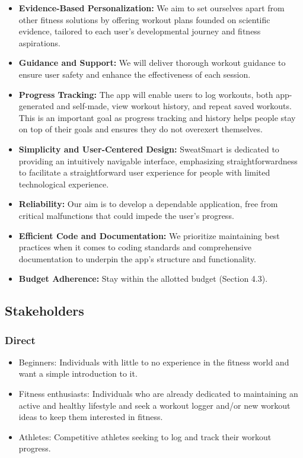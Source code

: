 \documentclass[12pt]{article}
\begin{document}
\begin{itemize}
    \item \textbf{Evidence-Based Personalization:} We aim to set ourselves apart from other fitness solutions by offering workout plans founded on scientific evidence, tailored to each user's developmental journey and fitness aspirations.
    \item \textbf{Guidance and Support:} We will deliver thorough workout guidance to ensure user safety and enhance the effectiveness of each session.
    \item \textbf{Progress Tracking:} The app will enable users to log workouts, both app-generated and self-made, view workout history, and repeat saved workouts. This is an important goal as progress tracking and history helps people stay on top of their goals and ensures they do not overexert themselves.
    \item \textbf{Simplicity and User-Centered Design:} SweatSmart is dedicated to providing an intuitively navigable interface, emphasizing straightforwardness to facilitate a straightforward user experience for people with limited technological experience.
    \item \textbf{Reliability:} Our aim is to develop a dependable application, free from critical malfunctions that could impede the user's progress.
    \item \textbf{Efficient Code and Documentation:} We prioritize maintaining best practices when it comes to coding standards and comprehensive documentation to underpin the app's structure and functionality.
    \item \textbf{Budget Adherence:} Stay within the allotted budget (Section 4.3).
\end{itemize}

\subsection{Stakeholders}

\subsubsection{Direct}
\begin{itemize}
  \item Beginners: Individuals with little to no experience in the fitness world and want a simple introduction to it.
  \item Fitness enthusiasts: Individuals who are already dedicated to maintaining an active and healthy lifestyle and seek a workout logger and/or new workout ideas to keep them interested in fitness.
  \item Athletes: Competitive athletes seeking to log and track their workout progress.
\end{itemize}
\end{document}
